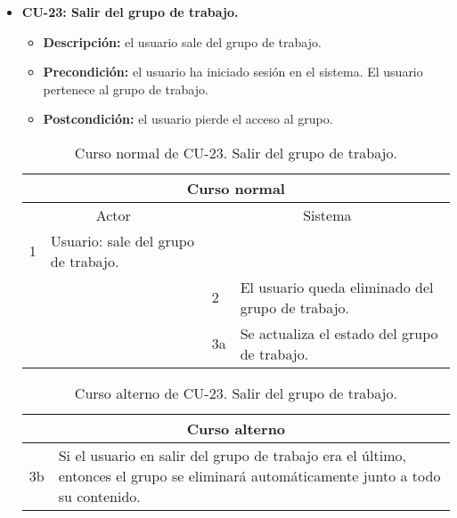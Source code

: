 \begin{itemize}
	\item \textbf{CU-23: Salir del grupo de trabajo.}
	\begin{itemize}
		\item \textbf{Descripción:} el usuario sale del grupo de trabajo.
		\item \textbf{Precondición:} el usuario ha iniciado sesión en el sistema. El usuario pertenece al grupo de trabajo.
		\item \textbf{Postcondición:} el usuario pierde el acceso al grupo.
	\end{itemize}
	\begin{table}[H]
		\centering
		\begin{tabular}{|p{0.3cm}|p{5cm}|p{0.3cm}|p{5cm}|}
			\hline
			\multicolumn{4}{|c|}{Curso normal} \\ \hline
			\multicolumn{2}{|c|}{Actor} & \multicolumn{2}{|c|}{Sistema} \\ \hline
			1 & Usuario: sale del grupo de trabajo. &  &  \\ \hline
			&  & 2 & El usuario queda eliminado del grupo de trabajo. \\ \hline
			&  & 3a & Se actualiza el estado del grupo de trabajo. \\ \hline
		\end{tabular}
		\caption{Curso normal de CU-23. Salir del grupo de trabajo.}
		\label{tabla:cu23-normal}
	\end{table}
	
	\begin{table}[H]
		\centering
		\begin{tabular}{|p{0.3cm}|p{10cm}|}
			\hline
			\multicolumn{2}{|c|}{Curso alterno} \\ \hline
			3b & Si el usuario en salir del grupo de trabajo era el último, entonces el grupo se eliminará automáticamente junto a todo su contenido. \\ \hline
		\end{tabular}
		\caption{Curso alterno de CU-23. Salir del grupo de trabajo.}
		\label{tabla:cu23-alterno}
	\end{table}
\end{itemize}

